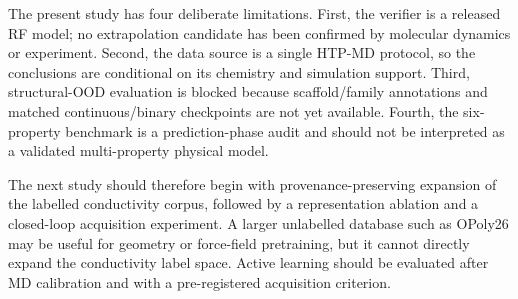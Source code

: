 The present study has four deliberate limitations. First, the verifier is a released RF model; no extrapolation candidate has been confirmed by molecular dynamics or experiment. Second, the data source is a single HTP-MD protocol, so the conclusions are conditional on its chemistry and simulation support. Third, structural-OOD evaluation is blocked because scaffold/family annotations and matched continuous/binary checkpoints are not yet available. Fourth, the six-property benchmark is a prediction-phase audit and should not be interpreted as a validated multi-property physical model.

The next study should therefore begin with provenance-preserving expansion of the labelled conductivity corpus, followed by a representation ablation and a closed-loop acquisition experiment. A larger unlabelled database such as OPoly26 may be useful for geometry or force-field pretraining, but it cannot directly expand the conductivity label space. Active learning should be evaluated after MD calibration and with a pre-registered acquisition criterion.\

